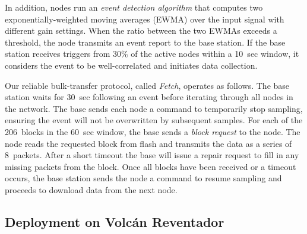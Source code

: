 In addition, nodes run an {\em event detection algorithm} that computes two
exponentially-weighted moving averages (EWMA) over the input signal with
different gain settings. When the ratio between the two EWMAs exceeds a
threshold, the node transmits an event report to the base station.
If the base station receives triggers from 30\% of the active nodes within a
10~sec window, it considers the event to be well-correlated and initiates
data collection.

Our reliable bulk-transfer protocol, called {\em Fetch}, operates as follows.
The base station waits for 30~sec following an event before iterating through
all nodes in the network. The base sends each node a command to temporarily
stop sampling, ensuring the event will not be overwritten by subsequent
samples.  For each of the 206~blocks in the 60~sec window, the base sends a
{\em block request} to the node.  The node reads the requested block from
flash and transmits the data as a series of 8~packets.  After a short timeout
the base will issue a repair request to fill in any missing packets from the
block.
Once all blocks have been received or a timeout occurs, the base station
sends the node a command to resume sampling and proceeds to download data
from the next node. 

\subsection{Deployment on Volc\'{a}n Reventador}

